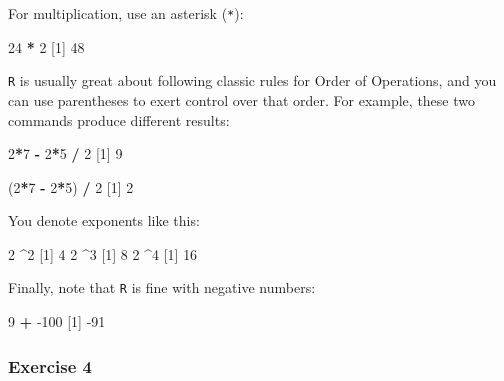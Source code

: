\documentclass[
]{book}
\newenvironment{Shaded}{\begin{snugshade}}{\end{snugshade}}
\newcommand{\DecValTok}[1]{\textcolor[rgb]{0.00,0.00,0.81}{#1}}
\newcommand{\NormalTok}[1]{#1}
\newcommand{\OperatorTok}[1]{\textcolor[rgb]{0.81,0.36,0.00}{\textbf{#1}}}
\newcommand{\StringTok}[1]{\textcolor[rgb]{0.31,0.60,0.02}{#1}}
\begin{document}
For multiplication, use an asterisk (\texttt{*}):

\begin{Shaded}
\begin{Highlighting}[]
\DecValTok{24} \OperatorTok{*}\StringTok{ }\DecValTok{2}
\NormalTok{[}\DecValTok{1}\NormalTok{] }\DecValTok{48}
\end{Highlighting}
\end{Shaded}

\texttt{R} is usually great about following classic rules for Order of Operations, and you can use parentheses to exert control over that order. For example, these two commands produce different results:

\begin{Shaded}
\begin{Highlighting}[]
\DecValTok{2}\OperatorTok{*}\DecValTok{7} \OperatorTok{-}\StringTok{ }\DecValTok{2}\OperatorTok{*}\DecValTok{5} \OperatorTok{/}\StringTok{ }\DecValTok{2}
\NormalTok{[}\DecValTok{1}\NormalTok{] }\DecValTok{9}

\NormalTok{(}\DecValTok{2}\OperatorTok{*}\DecValTok{7} \OperatorTok{-}\StringTok{ }\DecValTok{2}\OperatorTok{*}\DecValTok{5}\NormalTok{) }\OperatorTok{/}\StringTok{ }\DecValTok{2}
\NormalTok{[}\DecValTok{1}\NormalTok{] }\DecValTok{2}
\end{Highlighting}
\end{Shaded}

You denote exponents like this:

\begin{Shaded}
\begin{Highlighting}[]
\DecValTok{2} \OperatorTok{^}\DecValTok{2}
\NormalTok{[}\DecValTok{1}\NormalTok{] }\DecValTok{4}
\DecValTok{2} \OperatorTok{^}\DecValTok{3}
\NormalTok{[}\DecValTok{1}\NormalTok{] }\DecValTok{8}
\DecValTok{2} \OperatorTok{^}\DecValTok{4}
\NormalTok{[}\DecValTok{1}\NormalTok{] }\DecValTok{16}
\end{Highlighting}
\end{Shaded}

Finally, note that \texttt{R} is fine with negative numbers:

\begin{Shaded}
\begin{Highlighting}[]
\DecValTok{9} \OperatorTok{+}\StringTok{ }\DecValTok{-100}
\NormalTok{[}\DecValTok{1}\NormalTok{] }\DecValTok{-91}
\end{Highlighting}
\end{Shaded}

\hypertarget{exercise-4}{%
\subsubsection*{Exercise 4}\label{exercise-4}}
\end{document}
